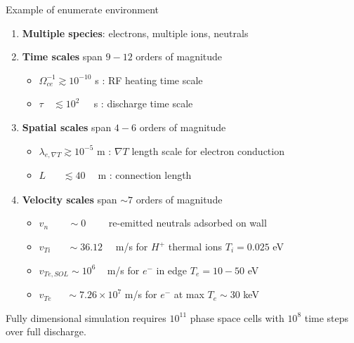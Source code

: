 \documentclass{beamer}
\begin{document}
\begin{frame}{Example of enumerate environment}
\begin{enumerate}
\item \textbf{Multiple species}: electrons, multiple ions, neutrals\\[0.5em]
\item \textbf{Time scales} span  $9 - 12$ orders of magnitude
\begin{itemize}
\item $\Omega_{ce}^{-1} \gtrsim 10^{-10}$ s : RF heating time scale \\[0.5em]
\item $\tau\phantom{_{ce}^{-1}} \lesssim 10^{2}\phantom{^{-0}}$ \,s : discharge time scale
\end{itemize}
\item \textbf{Spatial scales} span $4 - 6$ orders of magnitude
\begin{itemize}
\item $\lambda_{e,\nabla T} \gtrsim 10^{-5}$ m : $\nabla T$ length scale for electron conduction \\[0.5em]
\item $L\phantom{_{e,\nabla T}} \lesssim 40\phantom{^{-5}}$ m : connection length
\end{itemize}
\item \textbf{Velocity scales} span $\sim 7$ orders of magnitude
\begin{itemize}
\item $v_n\phantom{_i} \quad \,\,\,\,\sim 0$ \qquad \,\,\,\,\,\,\,\,\,\, re-emitted neutrals adsorbed on wall \\[0.5em]
\item $v_{Ti} \quad \,\,\,\,\sim 36.12$ \quad \,\,\,\, m/s for $H^+$ thermal ions $T_i = 0.025$ eV\\[0.5em]
\item $v_{Te,SOL} \sim 10^6$\qquad\,\,\,\,\,\,\,m/s for $e^-$ in edge $T_e = 10 - 50$ eV \\ [0.5em]  
\item $v_{Te} \quad \,\,\,\sim 7.26\times 10^{7}$ m/s for $e^-$ at max $T_e \sim 30$ keV \\[0.5em]
\end{itemize}
\end{enumerate}

Fully dimensional simulation requires $10^{11}$ phase space cells with $10^8$ time steps over full discharge.

 

\end{frame}
 
\end{document}
